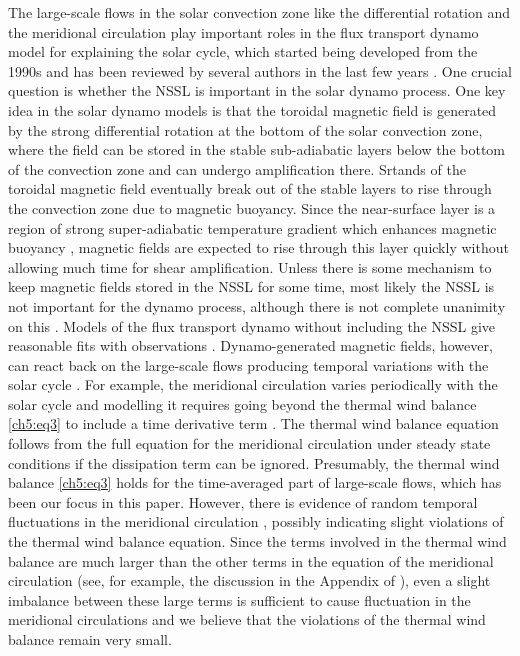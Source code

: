 The large-scale flows in the solar convection zone like the differential rotation and the meridional circulation play important roles in the flux transport dynamo model for explaining the solar cycle, which started being developed from the 1990s \citep{Wang1991,Choudhuri1995, Durney1995} and has been reviewed by several authors in the last few years \citep{Charbonneau2010, Choudhuri2011, Karak2014}.  One crucial question is whether the NSSL is important in the solar dynamo process.  One key idea in the solar dynamo models is that the toroidal magnetic field is generated by the strong differential rotation at the bottom of the solar convection zone, where the field can be stored in the stable sub-adiabatic layers below the bottom of the convection zone and can undergo amplification there. Srtands of the toroidal magnetic field eventually break out of the stable layers to rise through the convection zone due to magnetic buoyancy. Since the near-surface layer is a region of strong super-adiabatic temperature gradient which enhances magnetic buoyancy \citep{Moreno1983, Choudhuri1987}, magnetic fields are expected to rise through this layer quickly without allowing much time for shear amplification. Unless there is some mechanism to keep magnetic fields stored in the NSSL for some time, most likely the NSSL is not important for the dynamo process,
although there is not complete unanimity on this  \citep{Brandenburg2005}.
Models of the flux transport dynamo without including the NSSL give reasonable fits with observations \citep{Chatterjee2004}. 
Dynamo-generated magnetic fields, however, can react back on the large-scale flows producing temporal variations with the solar cycle \citep{Chakraborty2009, Hazra2017}. For example, the meridional circulation varies periodically with the solar cycle and modelling it requires going beyond the thermal wind balance \autoref{ch5:eq3} to include a time derivative term \citep{Hazra2017, Choudhuri2021b}. The thermal wind balance equation follows from the full equation for the meridional circulation under steady state conditions if the dissipation term can be ignored.  Presumably, the thermal wind balance \autoref{ch5:eq3} holds for the time-averaged part of large-scale flows, which has been our focus in this paper. However, there is evidence of random temporal fluctuations in the meridional circulation \citep{Karak2010, Karak2011, Choudhuri2012, Choudhuri2014, Hazra2019}, possibly indicating slight violations of the thermal wind balance equation. Since the terms involved in the thermal wind balance are much larger than the other terms in the equation of the meridional circulation (see, for example, the discussion in the Appendix of \citet{Choudhuri2021b}), even a slight imbalance between these large terms is sufficient to cause fluctuation in the meridional circulations and we believe that the violations of the thermal wind balance remain very small.

